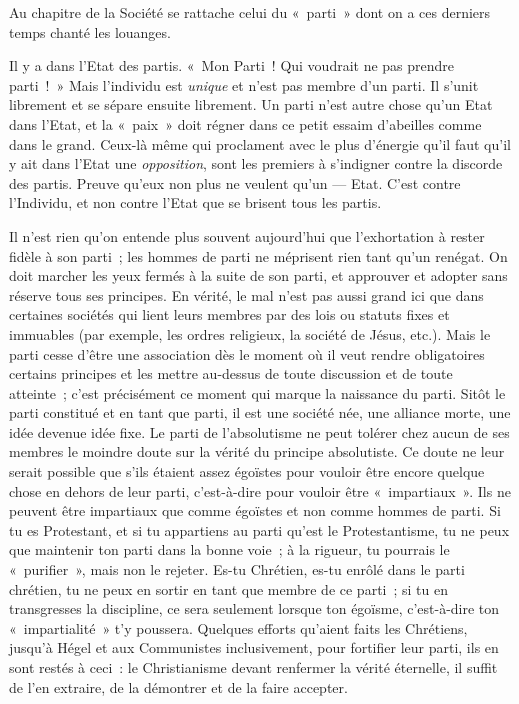 \documentclass[french,twoside]{book} %
\begin{document}
\noindent Au chapitre de la Société se rattache celui du « parti » dont on a ces derniers temps chanté les louanges.\par
Il y a dans l’Etat des partis. « Mon Parti ! Qui voudrait ne pas prendre parti ! » Mais l’individu est \emph{unique }et n’est pas membre d’un parti. Il s’unit librement et se sépare ensuite librement. Un parti n’est autre chose qu’un Etat dans l’Etat, et la « paix » doit régner dans ce petit essaim d’abeilles comme dans le grand. Ceux-là même qui proclament avec le plus d’énergie qu’il faut qu’il y ait dans l’Etat une \emph{opposition}, sont les premiers à s’indigner contre la discorde des partis. Preuve qu’eux non plus ne veulent qu’un — Etat. C’est contre l’Individu, et non contre l’Etat que se brisent tous les partis.\par
Il n’est rien qu’on entende plus souvent aujourd’hui que l’exhortation à rester fidèle à son parti ; les hommes de parti ne méprisent rien tant qu’un renégat. On doit marcher les yeux fermés à la suite de son parti, et approuver et adopter sans réserve tous ses principes. En vérité, le mal n’est pas aussi grand ici que dans certaines sociétés qui lient leurs membres par des lois ou statuts fixes et immuables (par exemple, les ordres religieux, la société de Jésus, etc.). Mais le parti cesse d’être une association dès le moment où il veut rendre obligatoires certains principes et les mettre au-dessus de toute discussion et de toute atteinte ; c’est précisément ce moment qui marque la naissance du parti. Sitôt le parti constitué et en tant que parti, il est une société née, une alliance morte, une idée devenue idée fixe. Le parti de l’absolutisme  ne peut tolérer chez aucun de ses membres le moindre doute sur la vérité du principe absolutiste. Ce doute ne leur serait possible que s’ils étaient assez égoïstes pour vouloir être encore quelque chose en dehors de leur parti, c’est-à-dire pour vouloir être « impartiaux ». Ils ne peuvent être impartiaux que comme égoïstes et non comme hommes de parti. Si tu es Protestant, et si tu appartiens au parti qu’est le Protestantisme, tu ne peux que maintenir ton parti dans la bonne voie ; à la rigueur, tu pourrais le « purifier », mais non le rejeter. Es-tu Chrétien, es-tu enrôlé dans le parti chrétien, tu ne peux en sortir en tant que membre de ce parti ; si tu en transgresses la discipline, ce sera seulement lorsque ton égoïsme, c’est-à-dire ton « impartialité » t’y poussera. Quelques efforts qu’aient faits les Chrétiens, jusqu’à Hégel et aux Communistes inclusivement, pour fortifier leur parti, ils en sont restés à ceci : le Christianisme devant renfermer la vérité éternelle, il suffit de l’en extraire, de la démontrer et de la faire accepter.\par
\end{document}
